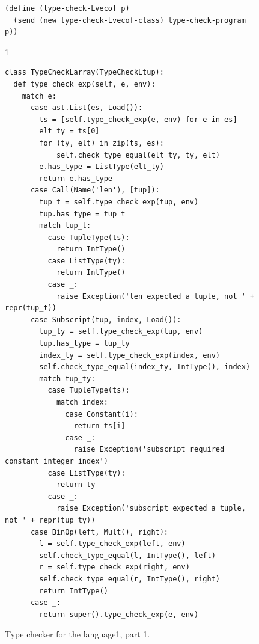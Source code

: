 \documentclass[7x10]{TimesAPriori_MIT}%
\def\pythonEd{1}
\providecommand{\BookEdition}{1}
\let\edition\BookEdition
\newcommand{\pythonColor}[0]{}
\newcommand{\python}[1]{{\if\edition\pythonEd\pythonColor #1\fi}}
\numberwithin{theorem}{chapter}
\numberwithin{definition}{chapter}
\numberwithin{equation}{chapter}
\begin{document}
\begin{figure}[tbp]
\begin{tcolorbox}[colback=white]
{\begin{lstlisting}[basicstyle=\ttfamily\footnotesize]
(define (type-check-Lvecof p)
  (send (new type-check-Lvecof-class) type-check-program p))
    \end{lstlisting}
    \fi}
{\if\edition\pythonEd\pythonColor    
\begin{lstlisting}[basicstyle=\ttfamily\footnotesize]
class TypeCheckLarray(TypeCheckLtup):
  def type_check_exp(self, e, env):
    match e:
      case ast.List(es, Load()):
        ts = [self.type_check_exp(e, env) for e in es]
        elt_ty = ts[0]
        for (ty, elt) in zip(ts, es):
            self.check_type_equal(elt_ty, ty, elt)
        e.has_type = ListType(elt_ty)
        return e.has_type
      case Call(Name('len'), [tup]):
        tup_t = self.type_check_exp(tup, env)
        tup.has_type = tup_t
        match tup_t:
          case TupleType(ts):
            return IntType()
          case ListType(ty):
            return IntType()
          case _:
            raise Exception('len expected a tuple, not ' + repr(tup_t))
      case Subscript(tup, index, Load()):
        tup_ty = self.type_check_exp(tup, env)
        tup.has_type = tup_ty
        index_ty = self.type_check_exp(index, env)
        self.check_type_equal(index_ty, IntType(), index)
        match tup_ty:
          case TupleType(ts):
            match index:
              case Constant(i):
                return ts[i]
              case _:
                raise Exception('subscript required constant integer index')
          case ListType(ty):
            return ty
          case _:
            raise Exception('subscript expected a tuple, not ' + repr(tup_ty))
      case BinOp(left, Mult(), right):
        l = self.type_check_exp(left, env)
        self.check_type_equal(l, IntType(), left)
        r = self.type_check_exp(right, env)
        self.check_type_equal(r, IntType(), right)
        return IntType()
      case _:
        return super().type_check_exp(e, env)
\end{lstlisting}
\fi}
  \end{tcolorbox}

  \caption{Type checker for the \LangArray{} language\python{, part 1}.}
\label{fig:type-check-Lvecof}
\end{figure}
\end{document}
